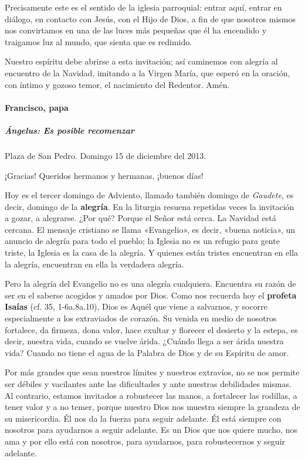 \documentclass[]{article}
\let\oldparagraph\paragraph
\renewcommand{\paragraph}[1]{\oldparagraph{#1}\mbox{}}
\let\oldsubparagraph\subparagraph
\renewcommand{\subparagraph}[1]{\oldsubparagraph{#1}\mbox{}}
\begin{document}
Precisamente este es el sentido de la iglesia parroquial: entrar aquí,
entrar en diálogo, en contacto con Jesús, con el Hijo de Dios, a fin de
que nosotros mismos nos convirtamos en una de las luces más pequeñas que
él ha encendido y traigamos luz al mundo, que sienta que es redimido.

Nuestro espíritu debe abrirse a esta invitación; así caminemos con
alegría al encuentro de la Navidad, imitando a la Virgen María, que
esperó en la oración, con íntimo y gozoso temor, el nacimiento del
Redentor. Amén.

\protect\hypertarget{_Toc448662749}{}{\protect\hypertarget{_Toc448690268}{}{\protect\hypertarget{_Toc448708291}{}{\protect\hypertarget{_Toc448709377}{}{\protect\hypertarget{_Toc449554379}{}{}}}}}

\paragraph{Francisco, papa}\label{francisco-papa-2}

\subparagraph{Ángelus: Es posible
recomenzar}\label{uxe1ngelus-es-posible-recomenzar}

Plaza de San Pedro.  Domingo 15 de diciembre del 2013.

¡Gracias! Queridos hermanos y hermanas, ¡buenos días!

Hoy es el tercer domingo de Adviento, llamado también domingo de
\emph{Gaudete}, es decir, domingo de la \textbf{alegría}. En la liturgia
resuena repetidas veces la invitación a gozar, a alegrarse. ¿Por qué?
Porque el Señor está cerca. La Navidad está cercana. El mensaje
cristiano se llama «Evangelio», es decir, «buena noticia», un anuncio de
alegría para todo el pueblo; la Iglesia no es un refugio para gente
triste, la Iglesia es la casa de la alegría. Y quienes están tristes
encuentran en ella la alegría, encuentran en ella la verdadera alegría.

Pero la alegría del Evangelio no es una alegría cualquiera. Encuentra su
razón de ser en el saberse acogidos y amados por Dios. Como nos recuerda
hoy el \textbf{profeta Isaías} (cf. 35, 1-6a.8a.10), Dios es Aquél que
viene a salvarnos, y socorre especialmente a los extraviados de corazón.
Su venida en medio de nosotros fortalece, da firmeza, dona valor, hace
exultar y florecer el desierto y la estepa, es decir, nuestra vida,
cuando se vuelve árida. ¿Cuándo llega a ser árida nuestra vida? Cuando
no tiene el agua de la Palabra de Dios y de su Espíritu de amor.

Por más grandes que sean nuestros límites y nuestros extravíos, no se
nos permite ser débiles y vacilantes ante las dificultades y ante
nuestras debilidades mismas. Al contrario, estamos invitados a
robustecer las manos, a fortalecer las rodillas, a tener valor y a no
temer, porque nuestro Dios nos muestra siempre la grandeza de su
misericordia. Él nos da la fuerza para seguir adelante. Él está siempre
con nosotros para ayudarnos a seguir adelante. Es un Dios que nos quiere
mucho, nos ama y por ello está con nosotros, para ayudarnos, para
robustecernos y seguir adelante.
\end{document}
